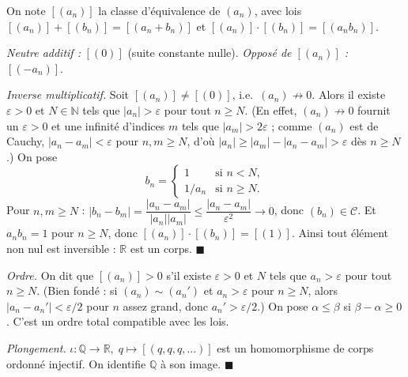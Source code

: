 \begin{mdframed}[style=proofbar]
  On note $[(a_n)]$ la classe d'équivalence de $(a_n)$, avec lois
  $[(a_n)]+[(b_n)] = [(a_n+b_n)]$ et $[(a_n)]\cdot[(b_n)]=[(a_nb_n)]$.

  \textit{Neutre additif :} $[(0)]$ (suite constante nulle).
  \textit{Opposé de $[(a_n)]$ :} $[(-a_n)]$.

  \textit{Inverse multiplicatif.}
  Soit $[(a_n)] \neq [(0)]$, i.e.\ $(a_n) \not\to 0$.
  Alors il existe $\varepsilon > 0$ et $N \in \mathbb{N}$ tels que
  $|a_n| > \varepsilon$ pour tout $n \geq N$.
  (En effet, $(a_n)\not\to 0$ fournit un $\varepsilon>0$ et une infinité d'indices
  $m$ tels que $|a_m| > 2\varepsilon$ ; comme $(a_n)$ est de Cauchy, $|a_n-a_m|<\varepsilon$
  pour $n,m\geq N$, d'où $|a_n| \geq |a_m| - |a_n-a_m| > \varepsilon$ dès $n\geq N$.)
  On pose
  \[
    b_n =
    \begin{cases}
      1 & \text{si } n < N, \\
      1/a_n & \text{si } n \geq N.
    \end{cases}
  \]
  Pour $n, m \geq N$ : $|b_n - b_m| = \dfrac{|a_n - a_m|}{|a_n||a_m|}
  \leq \dfrac{|a_n-a_m|}{\varepsilon^2} \to 0$,
  donc $(b_n) \in \mathcal{C}$.
  Et $a_nb_n = 1$ pour $n \geq N$, donc $[(a_n)]\cdot[(b_n)] = [(1)]$.
  Ainsi tout élément non nul est inversible : $\mathbb{R}$ est un corps.
  \hfill$\blacksquare$
\end{mdframed}


\begin{mdframed}[style=proofbar]
  \textit{Ordre.} On dit que $[(a_n)] > 0$ s'il existe $\varepsilon > 0$
  et $N$ tels que $a_n > \varepsilon$ pour tout $n \geq N$.
  (Bien fondé : si $(a_n)\sim(a_n')$ et $a_n > \varepsilon$ pour $n\geq N$,
  alors $|a_n-a_n'| < \varepsilon/2$ pour $n$ assez grand, donc $a_n' > \varepsilon/2$.)
  On pose $\alpha \leq \beta$ si $\beta - \alpha \geq 0$.
  C'est un ordre total compatible avec les lois.

  \textit{Plongement.} $\iota : \mathbb{Q} \to \mathbb{R},\; q \mapsto [(q,q,q,\ldots)]$
  est un homomorphisme de corps ordonné injectif.
  On identifie $\mathbb{Q}$ à son image.
  \hfill$\blacksquare$
\end{mdframed}


